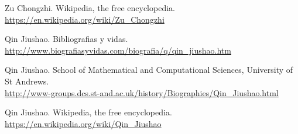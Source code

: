 \begin{thebibliography}{10}
Zu Chongzhi. Wikipedia, the free encyclopedia.\\
  \url{https://en.wikipedia.org/wiki/Zu_Chongzhi}
  
Qin Jiushao. Bibliografias y vidas.\\
  \url{http://www.biografiasyvidas.com/biografia/q/qin_jiushao.htm}

Qin Jiushao. School of Mathematical and Computational Sciences, University of St Andrews.\\
  \url{http://www-groups.dcs.st-and.ac.uk/history/Biographies/Qin_Jiushao.html}

Qin Jiushao. Wikipedia, the free encyclopedia.\\
  \url{https://en.wikipedia.org/wiki/Qin_Jiushao}

\end{thebibliography}
